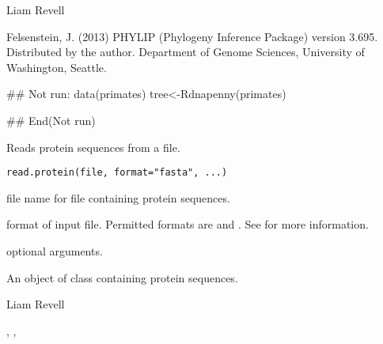 \documentclass[a4paper]{book}
\begin{document}
%
\begin{Author}\relax
Liam Revell 
\end{Author}
%
\begin{References}\relax
Felsenstein, J. (2013) PHYLIP (Phylogeny Inference Package) version 3.695. Distributed by the author. Department of Genome Sciences, University of Washington, Seattle.
\end{References}
%
\begin{SeeAlso}\relax
{}
\end{SeeAlso}
%
\begin{Examples}
\begin{ExampleCode}
## Not run: 
data(primates)
tree<-Rdnapenny(primates)

## End(Not run)
\end{ExampleCode}
\end{Examples}
%
\begin{Description}\relax
Reads protein sequences from a file.
\end{Description}
%
\begin{Usage}
\begin{verbatim}
read.protein(file, format="fasta", ...)
\end{verbatim}
\end{Usage}
%
\begin{Arguments}
\begin{ldescription}
\item[\code{file}] file name for file containing protein sequences.
\item[\code{format}] format of input file. Permitted formats are  and . See  for more information.
\item[\code{...}] optional arguments.
\end{ldescription}
\end{Arguments}
%
\begin{Value}
An object of class  containing protein sequences.
\end{Value}
%
\begin{Author}\relax
Liam Revell 
\end{Author}
%
\begin{SeeAlso}\relax
{}, , 
\end{SeeAlso}
\end{document}
